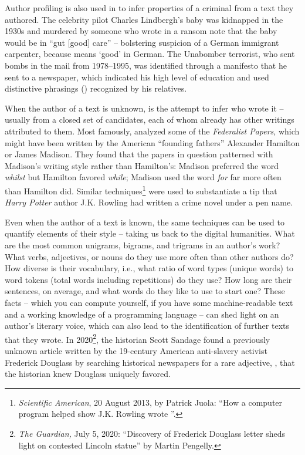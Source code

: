 Author profiling is also used in  to
infer properties of a criminal from a text they authored.  The
celebrity pilot Charles Lindbergh's baby was kidnapped in the 1930s
and murdered by someone who wrote in a ransom note that the baby would
be in ``gut [good] care'' -- bolstering suspicion of a German
immigrant carpenter, because  means `good' in German.  The
Unabomber terrorist, who sent bombs in the mail from 1978--1995, was identified
through a manifesto that he sent to a newspaper, which indicated his
high level of education and used distinctive phrasings
() recognized by his relatives.

When the author of a text is unknown, 
is the attempt to infer who wrote it -- usually from a closed set of
candidates, each of whom already has other writings attributed to
them.  Most famously, \citet{MostellerWallace:1963} analyzed some of
the \textit{Federalist Papers}, which might have been written by the
American ``founding fathers'' Alexander Hamilton or James Madison.
They found that the papers in question patterned with Madison's
writing style rather than Hamilton's: Madison preferred the word
\textit{whilst} but Hamilton favored \textit{while}; Madison used the
word \textit{for} far more often than Hamilton did.  Similar
techniques\footnote{\textit{Scientific American},
20 August 2013, by Patrick Juola: ``How a computer program helped
show J.K. Rowling wrote ''.} were used to substantiate a tip that \textit{Harry Potter}
author J.K. Rowling had written a crime novel under a pen name.

Even when the author of a text is known, the same techniques can be
used to quantify elements of their style -- taking us back to the
digital humanities.  What are the most common unigrams, bigrams, and
trigrams in an author's work?  What verbs, adjectives, or nouns do
they use more often than other authors do?  How diverse is their
vocabulary, i.e., what ratio of word types (unique words) to word tokens  (total words including repetitions) do they use?  How
long are their sentences, on average, and what words do they like to
use to start one?  These facts -- which you can compute yourself, if
you have some machine-readable text and a working knowledge of a
programming language -- can shed light on an author's literary voice,
which can also lead to the identification of further texts that they
wrote.  In 2020\footnote{\textit{The
Guardian,} July 5, 2020: ``Discovery of Frederick Douglass letter
sheds light on contested Lincoln statue'' by Martin Pengelly.}, the historian Scott Sandage found a previously unknown article written
by the 19-century American anti-slavery activist Frederick
Douglass by searching historical newspapers for a rare adjective,
, that the historian knew Douglass uniquely favored.


